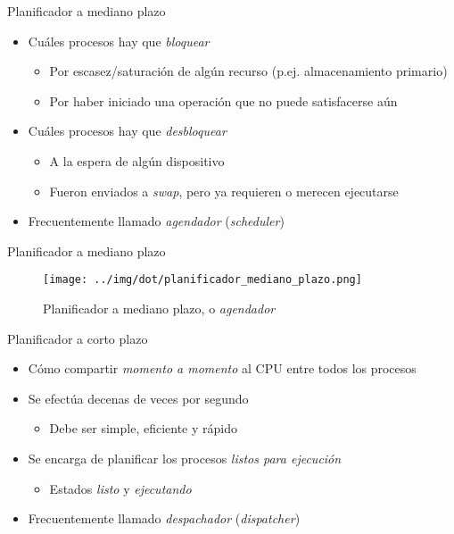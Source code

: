 \documentclass[presentation]{beamer}
\begin{document}
\begin{frame}[label={sec:org47ecf7d}]{Planificador a mediano plazo}
\begin{itemize}
\item Cuáles procesos hay que \emph{bloquear}
\begin{itemize}
\item Por escasez/saturación de algún recurso (p.ej. almacenamiento primario)
\item Por haber iniciado una operación que no puede satisfacerse aún
\end{itemize}
\item Cuáles procesos hay que \emph{desbloquear}
\begin{itemize}
\item A la espera de algún dispositivo
\item Fueron enviados a \emph{swap}, pero ya requieren o merecen ejecutarse
\end{itemize}
\item Frecuentemente llamado \emph{agendador} (\emph{scheduler})
\end{itemize}
\end{frame}

\begin{frame}[label={sec:org4b1e0c8}]{Planificador a mediano plazo}
\begin{figure}[htbp]
\centering
\texttt{[image: ../img/dot/planificador\_mediano\_plazo.png]}
\caption{Planificador a mediano plazo, o \emph{agendador}}
\end{figure}
\end{frame}

\begin{frame}[label={sec:org72c3fce}]{Planificador a corto plazo}
\begin{itemize}
\item Cómo compartir \emph{momento a momento} al CPU entre todos los procesos
\item Se efectúa decenas de veces por segundo
\begin{itemize}
\item Debe ser simple, eficiente y rápido
\end{itemize}
\item Se encarga de planificar los procesos \emph{listos para ejecución}
\begin{itemize}
\item Estados \emph{listo} y \emph{ejecutando}
\end{itemize}
\item Frecuentemente llamado \emph{despachador} (\emph{dispatcher})
\end{itemize}
\end{frame}
\end{document}
